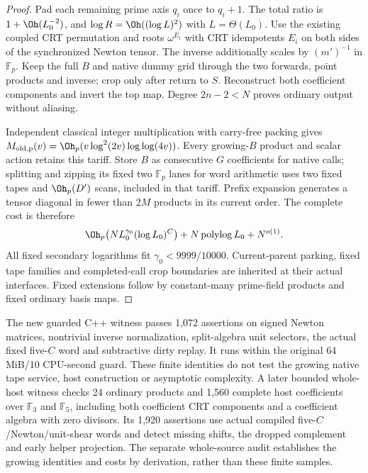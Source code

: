 \begin{proof}
Pad each remaining prime axis $q_i$ once to $q_i+1$. The total
ratio is $1+\Oh(L_0^{-2})$, and $\log R=\Oh((\log L)^2)$
with $L=\Theta(L_0)$. Use the existing coupled CRT permutation
and roots $\omega^{E_i}$ with CRT idempotents $E_i$ on both sides
of the synchronized Newton tensor. The inverse additionally scales
by $(m')^{-1}$ in $\mathbb F_p$. Keep the full $B$ and native
dummy grid through the two forwards, point products and inverse;
crop only after return to $S$. Reconstruct both coefficient
components and invert the top map. Degree $2n-2<N$ proves ordinary
output without aliasing.

Independent classical integer multiplication with carry-free packing
gives $M_{\rm old,p}(v)=\Oh_p(v\log^2(2v)\log\log(4v))$.
Every growing-$B$ product and scalar action retains this tariff.
Store $B$ as consecutive $G$ coefficients for native calls; splitting
and zipping its fixed two $\mathbb F_p$ lanes for word arithmetic uses
two fixed tapes and $\Oh_p(D')$ scans, included in that tariff.
Prefix expansion generates a tensor diagonal in fewer than $2M$
products in its current order. The complete cost is therefore
\[
 \Oh_p\bigl(NL_0^{\gamma_0}(\log L_0)^C\bigr)
       +N\operatorname{polylog}L_0+N^{o(1)}.
\]
All fixed secondary logarithms fit
$\gamma_0<9999/10000$. Current-parent parking, fixed tape families
and completed-call crop boundaries are inherited at their actual
interfaces. Fixed extensions follow by constant-many prime-field
products and fixed ordinary basis maps.
\end{proof}

The new guarded C++ witness passes 1,072 assertions on signed Newton
matrices, nontrivial inverse normalization, split-algebra unit selectors,
the actual fixed five-$C$ word and subtractive dirty replay. It runs
within the original 64 MiB/10 CPU-second guard. These finite identities
do not test the growing native tape service, host construction or
asymptotic complexity. A later bounded whole-host witness checks 24
ordinary products and 1,560 complete host coefficients over
$\mathbb F_3$ and $\mathbb F_5$, including both coefficient CRT
components and a coefficient algebra with zero divisors. Its 1,920
assertions use actual compiled five-$C$/Newton/unit-shear words and
detect missing shifts, the dropped complement and early helper
projection. The separate whole-source audit establishes the growing
identities and costs by derivation, rather than these finite samples.
